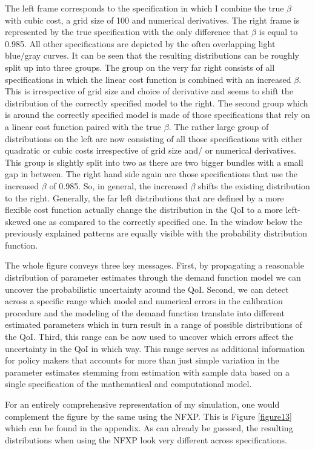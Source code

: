 The left frame corresponds to the specification in which I combine the true $\beta$ with cubic cost, a grid size of 100 and numerical derivatives. The right frame is represented by the true specification with the only difference that $\beta$ is equal to 0.985. All other specifications are depicted by the often overlapping light blue/gray curves. It can be seen that the resulting distributions can be roughly split up into three groups. The group on the very far right consists of all specifications in which the linear cost function is combined with an increased $\beta$. This is irrespective of grid size and choice of derivative and seems to shift the distribution of the correctly specified model to the right. The second group which is around the correctly specified model is made of those specifications that rely on a linear cost function paired with the true $\beta$. The rather large group of distributions on the left are now consisting of all those specifications with either quadratic or cubic costs irrespective of grid size and/ or numerical derivatives. This group is slightly split into two as there are two bigger bundles with a small gap in between. The right hand side again are those specifications that use the increased $\beta$ of 0.985. So, in general, the increased $\beta$ shifts the existing distribution to the right. Generally, the far left distributions that are defined by a more flexible cost function actually change the distribution in the QoI to a more left-skewed one as compared to the correctly specified one. In the window below the previously explained patterns are equally visible with the probability distribution function.

The whole figure conveys three key messages. First, by propagating a reasonable distribution of parameter estimates through the demand function model we can uncover the probabilistic uncertainty around the QoI. Second, we can detect across a specific range which model and numerical errors in the calibration procedure and the modeling of the demand function translate into different estimated parameters which in turn result in a range of possible distributions of the QoI. Third, this range can be now used to uncover which errors affect the uncertainty in the QoI in which way. This range serves as additional information for policy makers that accounts for more than just simple variation in the parameter estimates stemming from estimation with sample data based on a single specification of the mathematical and computational model.

For an entirely comprehensive representation of my simulation, one would complement the figure by the same using the NFXP. This is Figure \ref{figure13} which can be found in the appendix. As can already be guessed, the resulting distributions when using the NFXP look very different across specifications.

